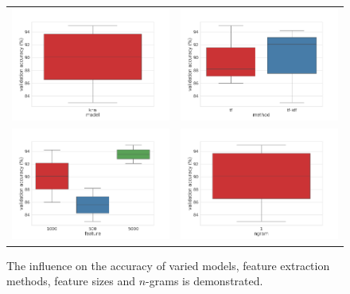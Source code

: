 \documentclass[a4paper,12pt,nottoc]{article}
\begin{document}
\begin{figure}[h]
\begin{center}
\begin{tabular}{c c}
\includegraphics[width=8cm]{output/model_performance.png} & \includegraphics[width=8cm]{output/method_performance.png} \\
\includegraphics[width=8cm]{output/feature_performance.png} & \includegraphics[width=8cm]{output/ngram_performance.png} \\
\end{tabular}
\end{center}
\caption{The influence on the accuracy of varied models, feature extraction methods, feature sizes and $n$-grams is demonstrated.}\label{fig:influenceparams}
\end{figure}
\end{document}

